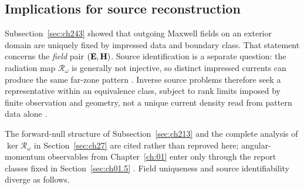 \subsection{Implications for source reconstruction}
\label{sec:ch244}

Subsection~\ref{sec:ch243} showed that outgoing Maxwell fields on an exterior domain are
uniquely fixed by impressed data and boundary class. That statement concerns the
\emph{field} pair \((\mathbf{E},\mathbf{H})\). Source identification is a separate question: the radiation
map $\mathcal{R}_\omega$ is generally not injective, so distinct impressed currents can
produce the same far-zone pattern \cite{devaney2004,hansen1988}. Inverse source problems
therefore seek a representative within an equivalence class, subject to rank limits imposed
by finite observation and geometry, not a unique current density read from pattern data alone
\cite{stratton1941}.

The forward-null structure of Subsection~\ref{sec:ch213} and the complete analysis of
$\ker\mathcal{R}_\omega$ in Section~\ref{sec:ch27} are cited rather than reproved here;
angular-momentum observables from Chapter~\ref{ch:01} enter only through the report classes
fixed in Section~\ref{sec:ch01.5} \cite{stratton1941}. Field uniqueness and source
identifiability diverge as follows.

